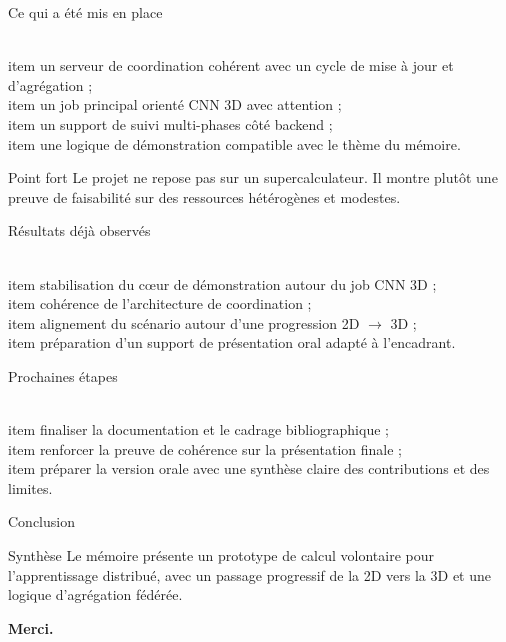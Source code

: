 \documentclass[11pt]{beamer}
\begin{document}
\begin{frame}{Ce qui a été mis en place}
  \begin{itemize}
    \\item un serveur de coordination cohérent avec un cycle de mise à jour et d'agrégation ;
    \\item un job principal orienté CNN 3D avec attention ;
    \\item un support de suivi multi-phases côté backend ;
    \\item une logique de démonstration compatible avec le thème du mémoire.
  \end{itemize}
  \vspace{0.3cm}
  \begin{exampleblock}{Point fort}
    Le projet ne repose pas sur un supercalculateur. Il montre plutôt une preuve de faisabilité sur des ressources hétérogènes et modestes.
  \end{exampleblock}
\end{frame}

\begin{frame}{Résultats déjà observés}
  \begin{itemize}
    \\item stabilisation du cœur de démonstration autour du job CNN 3D ;
    \\item cohérence de l'architecture de coordination ;
    \\item alignement du scénario autour d'une progression 2D $\rightarrow$ 3D ;
    \\item préparation d'un support de présentation oral adapté à l'encadrant.
  \end{itemize}
\end{frame}

\begin{frame}{Prochaines étapes}
  \begin{itemize}
    \\item finaliser la documentation et le cadrage bibliographique ;
    \\item renforcer la preuve de cohérence sur la présentation finale ;
    \\item préparer la version orale avec une synthèse claire des contributions et des limites.
  \end{itemize}
\end{frame}

\begin{frame}{Conclusion}
  \begin{block}{Synthèse}
    Le mémoire présente un prototype de calcul volontaire pour l'apprentissage distribué, avec un passage progressif de la 2D vers la 3D et une logique d'agrégation fédérée.
  \end{block}
  \vspace{0.5cm}
  \begin{center}
    \textbf{Merci.}
  \end{center}
\end{frame}
\end{document}
